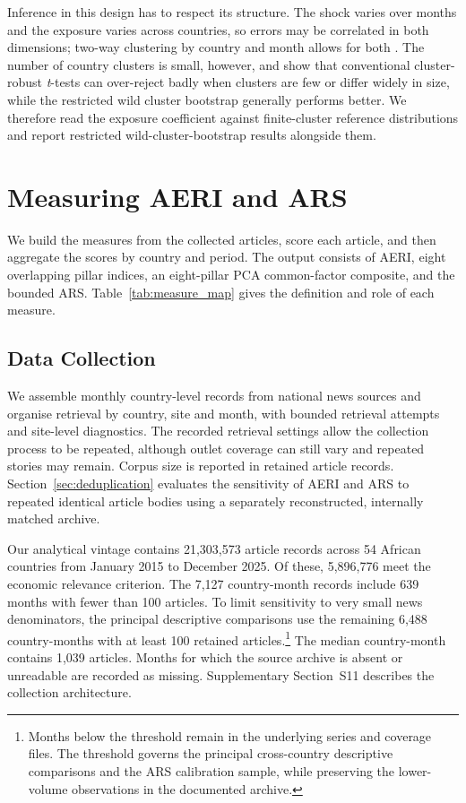 \documentclass[12pt]{article}
\begin{document}
Inference in this design has to respect its structure. The shock varies over months and the exposure varies across countries, so errors may be correlated in both dimensions; two-way clustering by country and month allows for both \citep{cameron2011}. The number of country clusters is small, however, and \citet{mackinnon2017} show that conventional cluster-robust \textit{t}-tests can over-reject badly when clusters are few or differ widely in size, while the restricted wild cluster bootstrap generally performs better. We therefore read the exposure coefficient against finite-cluster reference distributions and report restricted wild-cluster-bootstrap results alongside them.
\section{Measuring AERI and ARS}\label{sec:methodology}
We build the measures from the collected articles, score each article, and then aggregate the scores by country and period. The output consists of AERI, eight overlapping pillar indices, an eight-pillar PCA common-factor composite, and the bounded ARS. Table~\ref{tab:measure_map} gives the definition and role of each measure.

\subsection{Data Collection}\label{sec:data_collection}
We assemble monthly country-level records from national news sources and organise retrieval by country, site and month, with bounded retrieval attempts and site-level diagnostics. The recorded retrieval settings allow the collection process to be repeated, although outlet coverage can still vary and repeated stories may remain. Corpus size is reported in retained article records. Section~\ref{sec:deduplication} evaluates the sensitivity of AERI and ARS to repeated identical article bodies using a separately reconstructed, internally matched archive.

Our analytical vintage contains 21,303,573 article records across 54 African countries from January 2015 to December 2025. Of these, 5,896,776 meet the economic relevance criterion. The 7,127 country-month records include 639 months with fewer than 100 articles. To limit sensitivity to very small news denominators, the principal descriptive comparisons use the remaining 6,488 country-months with at least 100 retained articles.\footnote{Months below the threshold remain in the underlying series and coverage files. The threshold governs the principal cross-country descriptive comparisons and the ARS calibration sample, while preserving the lower-volume observations in the documented archive.} The median country-month contains 1,039 articles. Months for which the source archive is absent or unreadable are recorded as missing. Supplementary Section~S11 describes the collection architecture.
\end{document}
